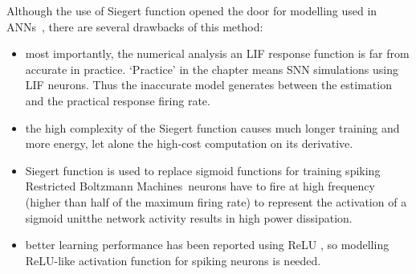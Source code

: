 		Although the use of \DIFaddbegin {}\DIFaddend Siegert function opened the door for modelling \DIFdelbegin {}\DIFdelend \DIFaddbegin {}\DIFaddend used in ANNs~\citep{Jug_etal_2012}, there are several drawbacks of this method:
	\begin{itemize}
		\item most importantly, the numerical analysis \DIFdelbegin {}\DIFdelend \DIFaddbegin {}\DIFaddend an LIF response function is far from accurate in practice. `Practice' in the chapter means SNN simulations using LIF neurons.
		Thus the inaccurate model generates \DIFdelbegin {}\DIFdelend \DIFaddbegin {}\DIFaddend between the estimation and the practical response firing rate.

		
		\item the high complexity of the Siegert function causes much longer training \DIFdelbegin {}\DIFdelend \DIFaddbegin {}\DIFaddend and more energy, let alone the high-cost computation on its derivative.
		\item \DIFaddbegin {}\DIFaddend Siegert function is used to replace sigmoid functions for training spiking Restricted Boltzmann Machines~\citep{Jug_etal_2012}\DIFdelbegin {}\DIFdelend \DIFaddbegin {}\DIFaddend neurons have to fire at high frequency (higher than half of the maximum firing rate) to represent the activation of a sigmoid unit\DIFdelbegin {}\DIFdelend \DIFaddbegin {}\DIFaddend the network activity results in high power dissipation.
		\item better learning performance has been reported using ReLU \DIFaddbegin {}\DIFaddend , so modelling \DIFaddbegin {}\DIFaddend ReLU-like activation function for spiking neurons is needed.  
	\end{itemize}

